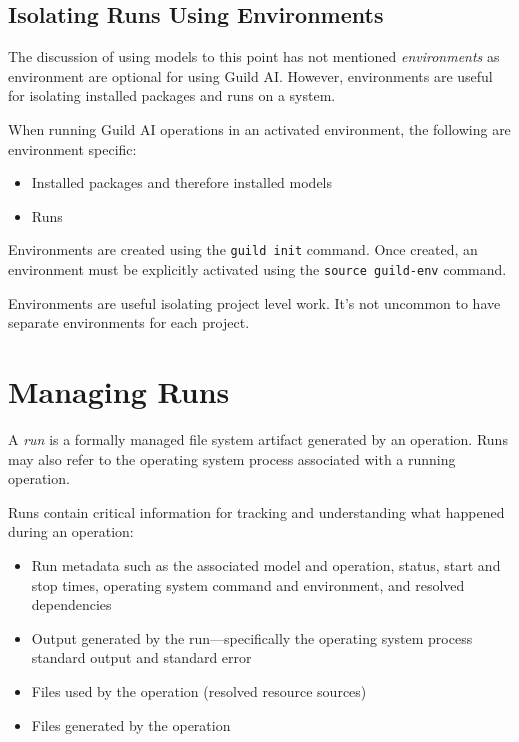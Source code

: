 \documentclass{article}
\begin{document}
\subsection{Isolating Runs Using Environments}

The discussion of using models to this point has not mentioned
\emph{environments} as environment are optional for using Guild
AI. However, environments are useful for isolating installed packages
and runs on a system.

When running Guild AI operations in an activated environment, the
following are environment specific:

\begin{itemize}
\item Installed packages and therefore installed models
\item Runs
\end{itemize}

Environments are created using the \verb|guild init| command. Once
created, an environment must be explicitly activated using the
\verb|source guild-env| command.

Environments are useful isolating project level work. It's not uncommon
to have separate environments for each project.

\section{Managing Runs}
\label{sec:runs}

A \emph{run} is a formally managed file system artifact generated by
an operation. Runs may also refer to the operating system process
associated with a running operation.

Runs contain critical information for tracking and understanding what
happened during an operation:

\begin{itemize}
\item Run metadata such as the associated model and operation, status,
  start and stop times, operating system command and environment, and
  resolved dependencies
\item Output generated by the run---specifically the operating system
  process standard output and standard error
\item Files used by the operation (resolved resource sources)
\item Files generated by the operation
\end{itemize}
\end{document}
